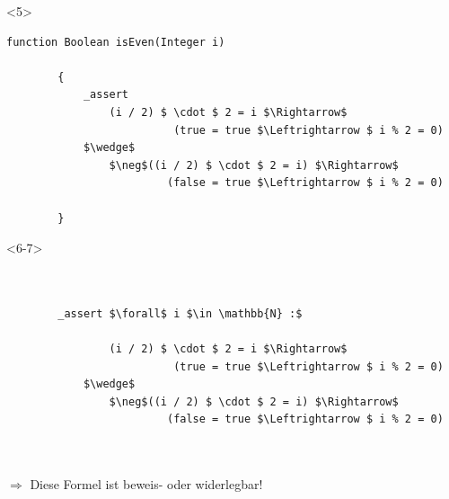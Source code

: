 \documentclass[t,svgnames]{beamer}
\begin{document}
\begin{frame}[fragile]
		\begin{onlyenv}<5>
	\begin{lstlisting}[frame=lines,mathescape=true]
		function Boolean isEven(Integer i)
		
		{
		    _assert
		        (i / 2) $ \cdot $ 2 = i $\Rightarrow$
		                  (true = true $\Leftrightarrow $ i % 2 = 0)
		    $\wedge$    	
		        $\neg$((i / 2) $ \cdot $ 2 = i) $\Rightarrow$
		                 (false = true $\Leftrightarrow $ i % 2 = 0)
		        	
		}
	\end{lstlisting}
	\end{onlyenv}
	
	
		\begin{onlyenv}
	\begin{lstlisting}[frame=lines,mathescape=true]
	
		        
		_assert $\forall$ i $\in \mathbb{N} :$	  
		    
		        (i / 2) $ \cdot $ 2 = i $\Rightarrow$
		                  (true = true $\Leftrightarrow $ i % 2 = 0)
		    $\wedge$    	
		        $\neg$((i / 2) $ \cdot $ 2 = i) $\Rightarrow$
		                 (false = true $\Leftrightarrow $ i % 2 = 0)
		        	
		
	\end{lstlisting}
	\end{onlyenv}
	
	\vspace{1cm}
	
	 {
		$\Rightarrow$ Diese Formel ist beweis- oder widerlegbar!
	}
\end{frame}
\end{document}
